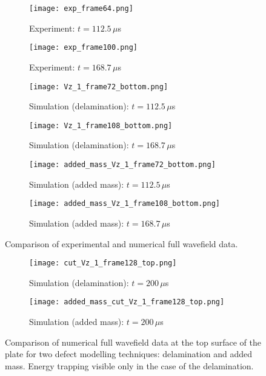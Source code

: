 \documentclass[preprint,12pt]{elsarticle}
\begin{document}
	\begin{figure} [h!]
		\begin{subfigure}[b]{0.49\textwidth}
			\centering
			\texttt{[image: exp\_frame64.png]}
			\caption{Experiment: $t=112.5\,  \mu$s}
			\label{fig:exp_frame64}
		\end{subfigure}
		\begin{subfigure}[b]{0.49\textwidth}
			\centering
			\texttt{[image: exp\_frame100.png]}
			\caption{Experiment: $t=168.7\, \mu$s}
			\label{fig:exp_frame100.png}
		\end{subfigure}
		\hfill
		\begin{subfigure}[b]{0.49\textwidth}
			\centering
			\texttt{[image: Vz\_1\_frame72\_bottom.png]} 
			\caption{Simulation (delamination): $t=112.5\,  \mu$s}
			\label{fig:num_frame72}
		\end{subfigure}
		\hfill
		\begin{subfigure}[b]{0.49\textwidth}
			\centering
			\texttt{[image: Vz\_1\_frame108\_bottom.png]}
			\caption{Simulation (delamination): $t=168.7\, \mu$s}
			\label{fig:num_frame108}
		\end{subfigure}
		\hfill
		\begin{subfigure}[b]{0.49\textwidth}
			\centering
			\texttt{[image: added\_mass\_Vz\_1\_frame72\_bottom.png]} 
			\caption{Simulation (added mass): $t=112.5\,  \mu$s}
			\label{fig:num_frame72_added_mass}
		\end{subfigure}
		\hfill
		\begin{subfigure}[b]{0.49\textwidth}
			\centering
			\texttt{[image: added\_mass\_Vz\_1\_frame108\_bottom.png]}
			\caption{Simulation (added mass): $t=168.7\, \mu$s}
			\label{fig:num_frame108_added_mass}
		\end{subfigure}
		\caption{Comparison of experimental and numerical full wavefield data.} 
		\label{fig:wavefields_comparison}
	\end{figure}

	\begin{figure} [h!]
		\begin{subfigure}[b]{0.49\textwidth}
			\centering
			\texttt{[image: cut\_Vz\_1\_frame128\_top.png]} 
			\caption{Simulation (delamination): $t=200\,  \mu$s}
			\label{fig:num_frame128_top}
		\end{subfigure}
		\hfill
		\begin{subfigure}[b]{0.49\textwidth}
			\centering
			\texttt{[image: added\_mass\_cut\_Vz\_1\_frame128\_top.png]}
			\caption{Simulation (added mass): $t=200\, \mu$s}
			\label{fig:num_frame128_added_mass_top}
		\end{subfigure}
		\caption{Comparison of numerical full wavefield data at the top surface of the plate for two defect modelling techniques: delamination and added mass. Energy trapping visible only in the case of the delamination.} 
		\label{fig:wave_entrapment}
	\end{figure}
\clearpage
\end{document}
